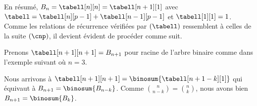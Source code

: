 En résumé,
$B_n = \tabell[n][n] = \tabell[n+1][1]$
avec
$\tabell = \tabell[n][p-1] + \tabell[n-1][p-1]$
et
$\tabell[1][1] = 1$. 
%
Comme les relations de récurrence vérifiées par $(\tabell)$ ressemblent à celles de la suite $(\cnp)$,
il devient évident de procéder comme suit.

\explaintree{\tabell}{\tabell[n][p-1]}{\tabell[n-1][p-1]}%
            {\bellintertree}{}

Prenons $\tabell[n+1][n+1] = B_{n+1}$ pour racine de l'arbre binaire comme dans l'exemple suivant où $n = 3$.


Nous arrivons à
$\tabell[n+1][n+1] = \binosum{\tabell[n+1-k][1]}$
qui équivaut à
$B_{n+1} = \binosum{B_{n-k}}$.
Comme $\binom{n}{n-k} = \binom{n}{k}$, nous avons bien 
$B_{n+1} = \binosum{B_k}$.